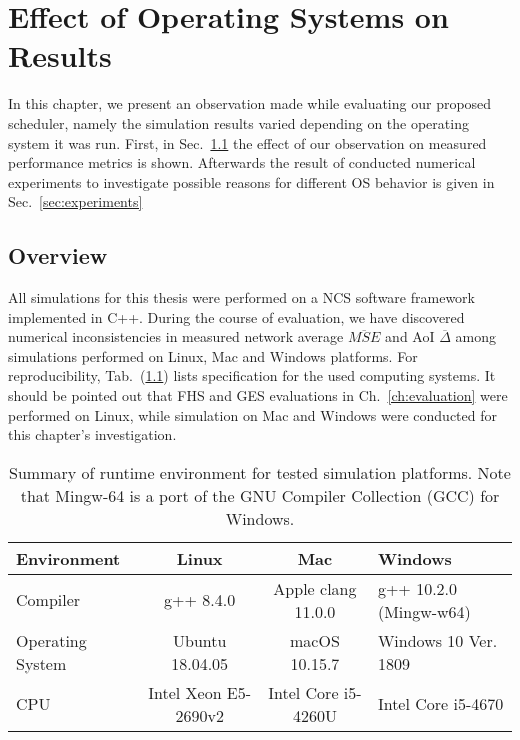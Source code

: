 \chapter{Effect of Operating Systems on Results}

In this chapter, we present an observation made while evaluating our proposed
scheduler, namely the simulation results varied depending on the operating
system it was run. First, in Sec.~\ref{sec:effect} the effect of our observation
on measured performance metrics is shown. Afterwards the result of conducted
numerical experiments to investigate possible reasons for different OS behavior
is given in Sec.~\ref{sec:experiments}

\section{Overview} \label{sec:effect}

All simulations for this thesis were performed on a NCS software framework
implemented in C++\footnotemark. During the course of evaluation, we have
discovered numerical inconsistencies in measured network average
$\overline{MSE}$ and AoI $\overline{\Delta}$ among simulations performed on
Linux, Mac and Windows platforms. For reproducibility, Tab.~(\ref{tab:specs})
lists specification for the used computing systems. It should be pointed out
that FHS and GES evaluations in Ch.~\ref{ch:evaluation} were performed on Linux,
while simulation on Mac and Windows were conducted for this chapter's
investigation.

\begin{table}[b]
  \begin{center}
  \begin{tabular}{|l|c|c|>{\centering\arraybackslash}p{3.4cm}|} 
  \hline
  \textbf{Environment} & \textbf{Linux} & \textbf{Mac} & \textbf{Windows} \\
  \hline \hline
  Compiler & g++ 8.4.0 & Apple clang 11.0.0 & g++ 10.2.0 (Mingw-w64) \\ 
  Operating System & Ubuntu 18.04.05 & macOS 10.15.7 & Windows 10 Ver. 1809 \\ 
  CPU & Intel Xeon E5-2690v2 & Intel Core i5-4260U & Intel Core i5-4670 \\
  \hline
  \end{tabular}
  \caption[Summary of runtime environment for tested simulation
  platforms]{Summary of runtime environment for tested simulation platforms.
  Note that Mingw-64 is a port of the GNU Compiler Collection (GCC) for
  Windows.}
  \label{tab:specs}
  \end{center}
\end{table}

